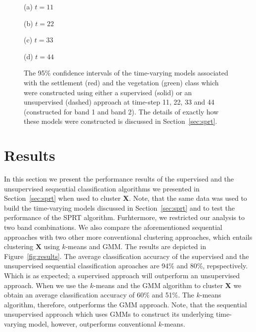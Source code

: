 \documentclass{article}
\begin{document}
\begin{figure}[h!]
\begin{minipage}[b]{.47\linewidth}
  \centering 
  \centerline{}
  \centerline{(a) $t=11$}\medskip
\end{minipage}
\hfill
\begin{minipage}[b]{0.47\linewidth}
  \centering
  \centerline{}
  \centerline{(b) $t=22$}\medskip
\end{minipage}

\begin{minipage}[b]{.47\linewidth}
  \centering 
  \centerline{}
  \centerline{(c) $t=33$}\medskip
\end{minipage}
\hfill
\begin{minipage}[b]{0.47\linewidth}
  \centering
  \centerline{}
  \centerline{(d) $t=44$}\medskip
\end{minipage}
\caption{The 95\% confidence intervals of the time-varying models associated with the settlement (red) and the vegetation (green) class which were constructed using either a supervised (solid) or an unsupervised (dashed) approach at time-step 11, 22, 33 and 44 (constructed 
for band 1 and band 2). The details of exactly how these models were constructed is discussed in Section~\ref{sec:sprt}.}
\label{fig:time_vary_model}
\end{figure}

\section{Results}
In this section we present the performance results of the supervised and the unsupervised sequential classification algorithms we presented in Section~\ref{sec:sprt} when used to cluster $\mathbf{X}$.
Note, that the same data was used to build the time-varying models discussed in Section~\ref{sec:sprt} and to test the 
performance of the SPRT algorithm. Furhtermore, we restricted our analysis to two band combinations. We also compare the aforementioned sequential approaches with two other more conventional clustering approaches, which entails clustering $\mathbf{X}$ using $k$-means and GMM. The results are depicted in Figure~\ref{fig:results}. The average classification accuracy of the supervised and the unsupervised sequential classification aproaches are 94\% and 80\%, repspectively. Which is 
as expected; a supervised approach will outperform an unsupervised approach. When we use the $k$-means and the GMM algorithm to cluster $\mathbf{X}$ we obtain 
an average classification accuracy of 60\% and 51\%. The $k$-means algorithm, therefore, outperforms the GMM approach. Note, that the sequential unsupervised approach which uses 
GMMs to construct its underlying time-varying model, however, outperforms conventional $k$-means. 
\end{document}
